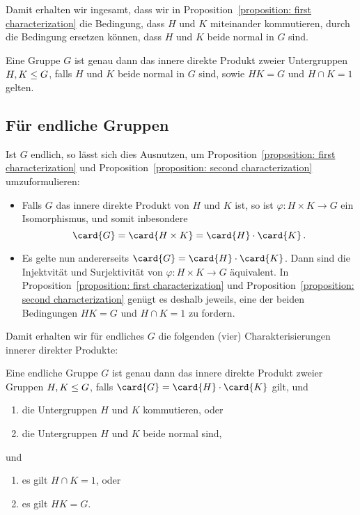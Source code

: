 Damit erhalten wir ingesamt, dass wir in Proposition~\ref{proposition: first characterization} die Bedingung, dass $H$ und $K$ miteinander kommutieren, durch die Bedingung ersetzen können, dass $H$ und $K$ beide normal in $G$ sind.

\begin{proposition}
  \label{proposition: second characterization}
  Eine Gruppe $G$ ist genau dann das innere direkte Produkt zweier Untergruppen $H, K \leq G$, falls $H$ und $K$ beide normal in $G$ sind, sowie $HK = G$ und $H \cap K = 1$ gelten.
\end{proposition}





\subsection*{Für endliche Gruppen}

Ist $G$ endlich, so lässt sich dies Ausnutzen, um Proposition~\ref{proposition: first characterization} und Proposition~\ref{proposition: second characterization} umzuformulieren:

\begin{itemize}
  \item
    Falls $G$ das innere direkte Produkt von $H$ und $K$ ist, so ist $\varphi \colon H \times K \to G$ ein Isomorphismus, und somit inbesondere
    \[
        \card{G}
      = \card{H \times K}
      = \card{H} \cdot \card{K} \,.
    \]
  \item
    Es gelte nun andererseits $\card{G} = \card{H} \cdot \card{K}$.
    Dann sind die Injektvität und Surjektivität von $\varphi \colon H \times K \to G$ äquivalent.
    In Proposition~\ref{proposition: first characterization} und Proposition~\ref{proposition: second characterization} genügt es deshalb jeweils, eine der beiden Bedingungen $HK = G$ und $H \cap K = 1$ zu fordern.
\end{itemize}

Damit erhalten wir für endliches $G$ die folgenden (vier) Charakterisierungen innerer direkter Produkte:

\begin{proposition}
  Eine endliche Gruppe $G$ ist genau dann das innere direkte Produkt zweier Gruppen $H, K \leq G$, falls $\card{G} = \card{H} \cdot \card{K}$ gilt, und
  \begin{enumerate}
    \item
      die Untergruppen $H$ und $K$ kommutieren, oder
    \item
      die Untergruppen $H$ und $K$ beide normal sind,
  \end{enumerate}
  und 
  \begin{enumerate}[label=\arabic*'.]
    \item
      es gilt $H \cap K = 1$, oder
    \item
      es gilt $H K = G$.
  \end{enumerate}
\end{proposition}

